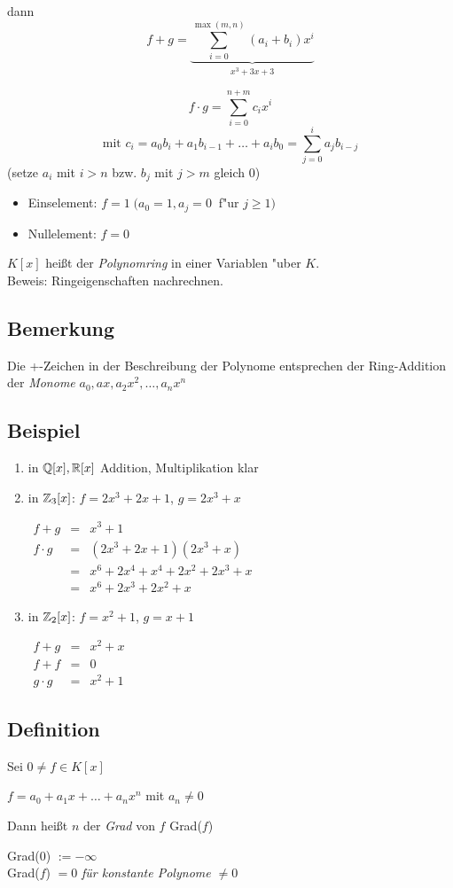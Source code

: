 dann \[f + g = \underbrace{\sum_{i=0}^{\max(m,n)}(a_i+b_i)x^i}_{x^3 + 3x +3}\]

\[f \cdot g = {\sum_{i=0}^{n+m} c_ix^i}\] 
\[\text{mit } c_i= a_0b_i+a_1b_{i-1}+ \dots + a_ib_0 = \sum_{j=0}^{i} a_jb_{i-j}  \tag{Faltungsprodukt}\]
(setze $a_i$ mit $i>n$ bzw. $b_j$ mit $j>m$ gleich 0)
\begin{itemize}
	\item
	Einselement: $f=1 \;(a_0=1, a_j = 0 \;\;$f"ur $ j\geq 1)$
	\item
	Nullelement: $f= 0$
\end{itemize}
$K[x]$ heißt der \emph{Polynomring} in einer Variablen "uber $K$.\\
Beweis: Ringeigenschaften nachrechnen.

\subsection{Bemerkung}
Die +-Zeichen in der Beschreibung der Polynome entsprechen der Ring-Addition der \emph{Monome} $a_0, ax, a_2x^2, \dots, a_nx^n$

\subsection{Beispiel}

\begin{enumerate}
	\item 
	in $\mathbb{Q}[x], \mathbb{R}[x]$ Addition, Multiplikation klar
	
	\item
	in $\mathbb{Z}_3[x]$:
	$f = 2x^3 + 2x + 1$,
	$g = 2x^3 + x$
	
	$\begin{array}{lcl}
	f + g &=& x^3 + 1 \\
	f \cdot g &=& (2x^3 + 2x + 1)(2x^3 + x) \\
	&=& x^6 + 2x^4 + x^4 + 2x^2 + 2x^3 + x \\
	&=& x^6 + 2x^3 + 2x^2 + x
	\end{array}$
	
	\item
	in $\mathbb{Z}_2[x]$:
	$f = x^2 + 1$,
	$g = x + 1$
	
	$\begin{array}{lcl}
	f+g &=& x^2 + x \\
	f+f &=& 0 \\
	g \cdot g &=& x^2 + 1
	\end{array}$
	
	
\end{enumerate}


\subsection[Definition: Grad eines Polynoms]{Definition}

Sei $0 \neq f \in K[x]$

$f=a_0 + a_1x + \dots + a_nx^n$ mit $a_n \neq 0$

Dann heißt $n$ der \emph{Grad} von $f$ Grad($f$)

Grad($0$) $:= - \infty$ \\
Grad($f$) $=0$ \quad \emph{für konstante Polynome $\neq 0$}
















